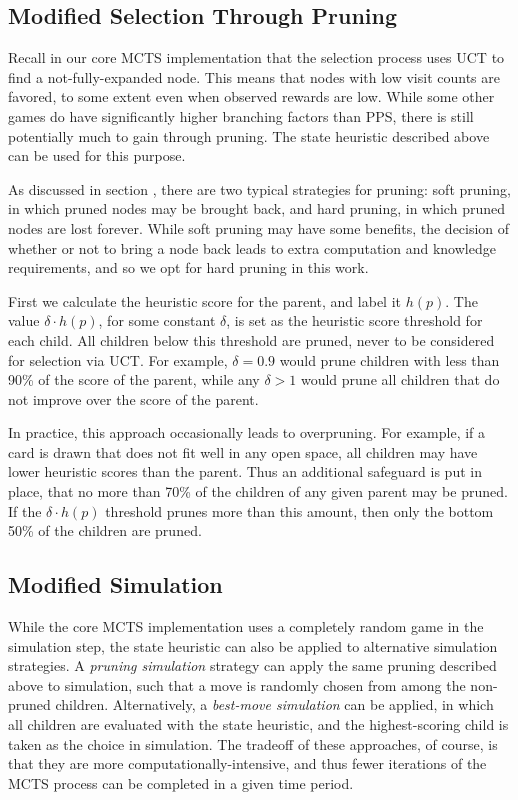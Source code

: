 \documentclass[letterpaper]{article}
\begin{document}
\subsection{Modified Selection Through Pruning}

Recall in our core MCTS implementation that the selection process uses UCT to find a not-fully-expanded node. This means that nodes with low visit counts are favored, to some extent even when observed rewards are low. While some other games do have significantly higher branching factors than PPS, there is still potentially much to gain through pruning. The state heuristic described above can be used for this purpose.

As discussed in section {\it {}}, there are two typical strategies for pruning: soft pruning, in which pruned nodes may be brought back, and hard pruning, in which pruned nodes are lost forever. While soft pruning may have some benefits, the decision of whether or not to bring a node back leads to extra computation and knowledge requirements, and so we opt for hard pruning in this work.

First we calculate the heuristic score for the parent, and label it $h(p)$. The value $\delta \cdot h(p)$, for some constant $\delta$, is set as the heuristic score threshold for each child. All children below this threshold are pruned, never to be considered for selection via UCT. For example, $\delta = 0.9$ would prune children with less than 90\% of the score of the parent, while any $\delta > 1$ would prune all children that do not improve over the score of the parent.

In practice, this approach occasionally leads to overpruning. For example, if a card is drawn that does not fit well in any open space, all children may have lower heuristic scores than the parent. Thus an additional safeguard is put in place, that no more than 70\% of the children of any given parent may be pruned. If the  $\delta \cdot h(p)$ threshold prunes more than this amount, then only the bottom 50\% of the children are pruned.

\subsection{Modified Simulation}

While the core MCTS implementation uses a completely random game in the simulation step, the state heuristic can also be applied to alternative simulation strategies. A {\it pruning simulation} strategy can apply the same pruning described above to simulation, such that a move is randomly chosen from among the non-pruned children. Alternatively, a {\it best-move simulation} can be applied, in which all children are evaluated with the state heuristic, and the highest-scoring child is taken as the choice in simulation. The tradeoff of these approaches, of course, is that they are more computationally-intensive, and thus fewer iterations of the MCTS process can be completed in a given time period. 
\end{document}
